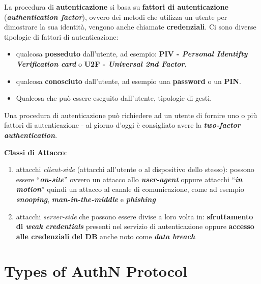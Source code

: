 \begin{flushleft}
    La procedura di \textbf{autenticazione} si basa su \textbf{fattori di autenticazione} (\textbf{\textit{authentication factor}}), ovvero dei metodi che utilizza un utente per dimostrare la sua identità, vengono anche chiamate \textbf{credenziali}. Ci sono diverse tipologie di fattori di autenticazione:
    \begin{itemize}[nosep]
        \item qualcosa \textbf{posseduto} dall'utente, ad esempio: \textbf{PIV - \textit{Personal Identifty Verification card}} o \textbf{U2F - \textit{Universal 2nd Factor}}.
        \item qualcosa \textbf{conosciuto} dall'utente, ad esempio una \textbf{password} o un \textbf{PIN}.
        \item Qualcosa che può essere eseguito dall'utente, tipologie di gesti.
    \end{itemize}
    Una procedura di autenticazione può richiedere ad un utente di fornire uno o più fattori di autenticazione - al giorno d'oggi è consigliato avere la \textbf{\textit{two-factor authentication}}.

    \medskip

    \textbf{Classi di Attacco}:
    \begin{enumerate}[nosep]
        \item attacchi \textit{client-side} (attacchi all'utente o al dispositivo dello stesso): possono essere ``\textbf{\textit{on-site}}'' ovvero un attacco allo \textbf{\textit{user-agent}} oppure attacchi ``\textbf{\textit{in motion}}'' quindi un attacco al canale di comunicazione, come ad esempio \textbf{\textit{snooping}}, \textbf{\textit{man-in-the-middle}} e \textbf{\textit{phishing}}
        \item attacchi \textit{server-side} che possono essere divise a loro volta in: \textbf{sfruttamento di \textit{weak credentials}} presenti nel servizio di autenticazione oppure \textbf{accesso alle credenziali del DB} anche noto come \textbf{\textit{data breach}}
    \end{enumerate}
\end{flushleft}

\section{Types of AuthN Protocol}

